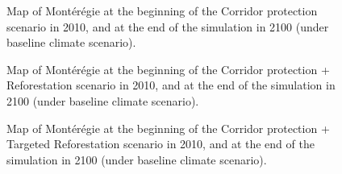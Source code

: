 
\begin{figure}[h!]
  \caption[Map of Montérégie at the beginning of the Corridor protection scenario in 2010, and at the end in 2100 (under baseline climate scenario)]{Map of Montérégie at the beginning of the Corridor protection scenario in 2010, and at the end of the simulation in 2100 (under baseline climate scenario).}
 \label{fig:Corr_compare}
\end{figure}

\begin{figure}[h!]
  \caption[Map of Montérégie at the beginning of the Corridor protection + Reforestation scenario in 2010, and at the end in 2100 (under baseline climate scenario)]{Map of Montérégie at the beginning of the Corridor protection + Reforestation scenario in 2010, and at the end of the simulation in 2100 (under baseline climate scenario).}
 \label{fig:	CorrRef_compare}
\end{figure}

\begin{figure}[h!]
  \caption[Map of Montérégie at the beginning of the Corridor protection + Targeted Reforestation scenario in 2010, and at the end in 2100 (under baseline climate scenario)]{Map of Montérégie at the beginning of the Corridor protection + Targeted Reforestation scenario in 2010, and at the end of the simulation in 2100 (under baseline climate scenario).}
 \label{fig:	CorrRefT_compare}
\end{figure}


